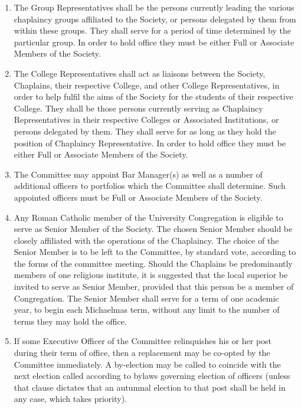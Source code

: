 \documentclass[11pt]{article}
\begin{document}
\begin{enumerate}
\item The Group Representatives shall be the persons currently leading the various chaplaincy groups affiliated to the Society, or persons delegated by them from within these groups. They shall serve for a period of time determined by the particular group. In order to hold office they must be either Full or Associate Members of the Society.
\item The College Representatives shall act as liaisons between the Society, Chaplains, their respective College, and other College Representatives, in order to help fulfil the aims of the Society for the students of their respective College. They shall be those persons currently serving as Chaplaincy Representatives in their respective Colleges or Associated Institutions, or persons delegated by them. They shall serve for as long as they hold the position of Chaplaincy Representative. In order to hold office they must be either Full or Associate Members of the Society.
\item The Committee may appoint Bar Manager(s) as well as a number of additional officers to portfolios which the Committee shall determine. Such appointed officers must be Full or Associate Members of the Society.
\item Any Roman Catholic member of the University Congregation is eligible to serve as Senior Member of the Society. The chosen Senior Member should be closely affiliated with the operations of the Chaplaincy. The choice of the Senior Member is to be left to the Committee, by standard vote, according to the forms of the committee meeting. Should the Chaplains be predominantly members of one religious institute, it is suggested that the local superior be invited to serve as Senior Member, provided that this person be a member of Congregation. The Senior Member shall serve for a term of one academic year, to begin each Michaelmas term, without any limit to the number of terms they may hold the office.
\item If some Executive Officer of the Committee relinquishes his or her post during their term of office, then a replacement may be co-opted by the Committee immediately. A by-election may be called to coincide with the next election called according to bylaws governing election of officers (unless that clause dictates that an autumnal election to that post shall be held in any case, which takes priority).
\end{enumerate}
\end{document}
